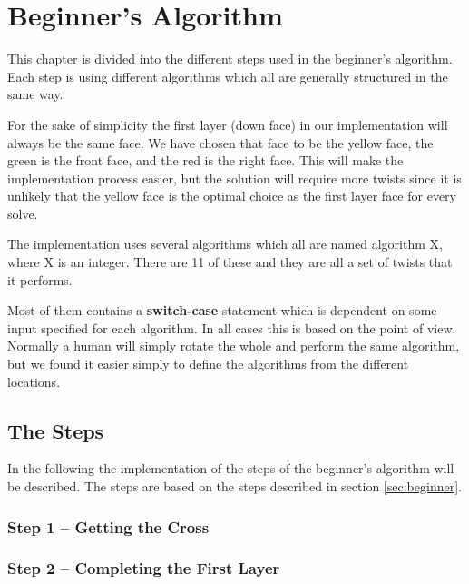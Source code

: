 \chapter{Beginner's Algorithm}\label{chap:beginnerImplement}
This chapter is divided into the different steps used in the beginner's algorithm.
Each step is using different algorithms which all are generally structured in the same way. 

For the sake of simplicity the first layer (down face) in our implementation will always be the same face. We have chosen that face to be the yellow face, the green is the front face, and the red is the right face. This will make the implementation process easier, but the solution will require more twists since it is unlikely that the yellow face is the optimal choice as the first layer face for every solve.

The implementation uses several algorithms which all are named algorithm X, where X is an integer. There are 11 of these and they are all a set of twists that it performs.

Most of them contains a \textbf{switch-case} statement which is dependent on some input specified for each algorithm. In all cases this is based on the point of view. Normally a human will simply rotate the whole \cube{} and perform the same algorithm, but we found it easier simply to define the algorithms from the different locations.

\section{The Steps}
In the following the implementation of the steps of the beginner's algorithm will be described.
The steps are based on the steps described in section \ref{sec:beginner}. 
\subsection{Step 1 -- Getting the Cross}

\subsection{Step 2 -- Completing the First Layer}

